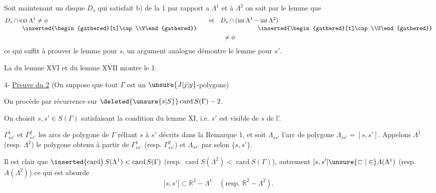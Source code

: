 Soit maintenant un disque $D_s$ qui satisfait b) de la  1 par rapport a $\Lambda^{1}$ et à $\Lambda^{2}$ on sait par le lemme  que
\[
\begin{aligned}
D_s\cap{}&\mathrm{ext}\,\Lambda^{1}\ne\phi
  &\quad\text{et}\quad D_s\cap{}&(\mathrm{int}\,\Lambda^{1}-\mathrm{int}\,\Lambda^{2})\\[-.5ex]
 &\hphantom{\mathrm{e}}\inserted{\begin{gathered}[t]\cap\\V\end{gathered}}
  &\begin{gathered}[t]\vphantom{\cap}\\\ne\phi\end{gathered}
  &\hphantom{(\mathrm{int}\,\Lambda^{1}-}\inserted{\begin{gathered}[t]\cap\\U\end{gathered}}
\end{aligned}
\]
ce qui suffit à prouver le lemme pour $s$, un argument analogue démontre le lemme pour $s'$.

La  du lemme $\underline{\overline{\mathrm{XVI}}}$ et du lemme $\underline{\overline{\mathrm{XVII}}}$ montre le  1.

4- \uline{Preuve du  2} (On suppose que tout  $\Gamma$ est un $\unsure{J|j|y}$-polygone)

On procède par récurrence sur $\deleted{\unsure{s|S}}\mathop{\mathrm{card}} S(\Gamma)-2$.

On choisit $s,s'\in S(\Gamma)$ satisfaisant la condition du lemme XI, i.e. $s'$ est visible de $s$ de l'.

  $\Gamma^{1}_{ss'}$ et $\Gamma^{2}_{ss'}$  les  arcs de polygone de $\Gamma$ réliant $s$ à $s'$ décrits dans la Remarque 1, et soit $\Lambda_{ss'}$ l'arc de polygone $\Lambda_{ss'}=[s,s']$. Appelons $\Lambda^{1}$  (resp. $\Lambda^{2}$) le polygone obtenu à partir de $\Gamma^{1}_{ss'}$ (resp. $\Gamma^{2}_{ss'}$) et $\Lambda_{ss'}$ par  selon $\{s,s'\}$.

Il est clair que $\inserted{\mathrm{card}}\,S(\Lambda^{1})<\mathop{\mathrm{card}} S(\Gamma)$ (resp. $\mathop{\mathrm{card}} S(\Lambda^{2})<\mathop{\mathrm{card}} S(\Gamma)$), autrement
$[s,s']\unsure{\subset|\in} A(\Lambda^{1})$ (resp. $A(\Lambda^{2})$) ce qui est absurde 
\[
{]s,s'[}\subset\mathbb{R}^{2}-\Lambda^{1}\quad(\text{resp. }\mathbb{R}^{2}-\Lambda^{2}).
\]

